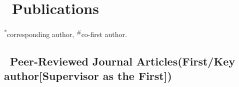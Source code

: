 \newcommand{\Revision}{\textit{under revision}}
\newcommand{\Review}{\textit{under review}}
\newcommand{\Submitted}{\textit{submitted}}
\newcommand{\CS}{\textsuperscript{*}} %
\newcommand{\CF}{\textsuperscript{\#}} %

\section{\texorpdfstring{\faBook\ Publications}{Publications}}
\CS corresponding author, \CF co-first author.

\subsection*{\texorpdfstring{\faBook\ Peer-Reviewed Journal Articles(First/Key author[Supervisor as the First])}{Peer-Reviewed Journal Articles(First/Key author[Supervisor as the First])}}
